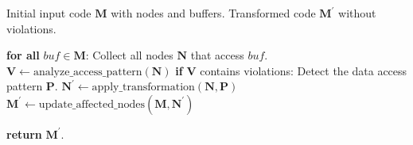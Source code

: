 \documentclass[conference]{IEEEtran}
\begin{document}


{\tiny
\renewcommand{\baselinestretch}{1}
\begin{algorithm}[t]
    \renewcommand{\algorithmicrequire}{\textbf{Input:}}
    \renewcommand{\algorithmicensure}{\textbf{Output:}}
    \caption{Pattern-aware Violation Elimination}
    \label{alg:template_compact}
    \begin{algorithmic}[1]
        \REQUIRE Initial input code $\mathbf{M}$ with nodes and buffers.
        \ENSURE Transformed code $\mathbf{M^{'}}$ without violations.

        \STATE \textbf{for all} $buf \in \mathbf{M}$:
        \STATE \quad Collect all nodes $\mathbf{N}$ that access $buf$.
        \STATE \quad $\mathbf{V} \gets \text{analyze\_access\_pattern}(\mathbf{N})$
        \STATE \quad \textbf{if} $\mathbf{V}$ contains violations:
        \STATE \quad \quad Detect the data access pattern $\mathbf{P}$.
        \STATE \quad \quad $\mathbf{N^{'}} \gets \text{apply\_transformation}(\mathbf{N}, \mathbf{P})$
        \STATE \quad \quad $\mathbf{M^{'}} \gets \text{update\_affected\_nodes}(\mathbf{M}, \mathbf{N^{'}})$

        \STATE \textbf{return} $\mathbf{M^{'}}$.
    \end{algorithmic}
\end{algorithm}
}
\vspace{-0.2cm}

\end{document}
